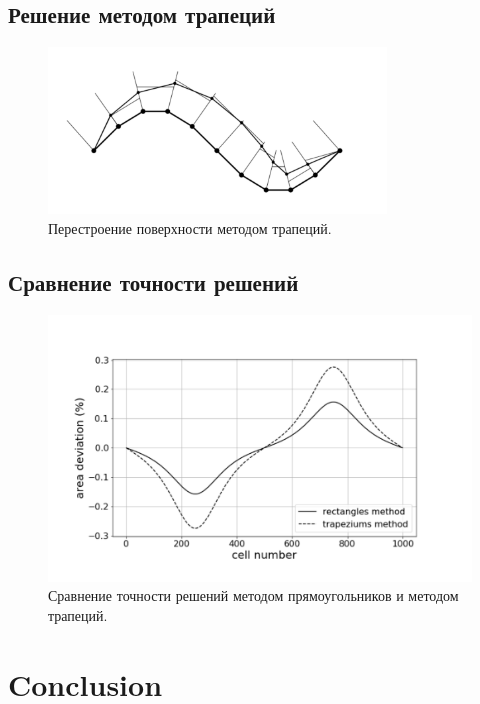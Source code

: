\documentclass[
11pt,%
tightenlines,%
twoside,%
onecolumn,%
nofloats,%
nobibnotes,%
nofootinbib,%
superscriptaddress,%
noshowpacs,%
centertags]%
{revtex4}
\begin{document}
\subsection{Решение методом трапеций}

\begin{figure}[h]
\setcaptionmargin{5mm}
\onelinecaptionstrue
\includegraphics[width=0.8\textwidth]{pics/grid_trapeziums.pdf}
\caption{Перестроение поверхности методом трапеций.}
\label{fig:grid_trapeziums}
\end{figure}

\subsection{Сравнение точности решений}

\begin{figure}[h]
\setcaptionmargin{5mm}
\onelinecaptionstrue
\includegraphics[width=1.0\textwidth]{pics/graphic.pdf}
\caption{Сравнение точности решений методом прямоугольников и методом трапеций.}
\label{fig:graphic}
\end{figure}

\section{Conclusion}
\end{document}
